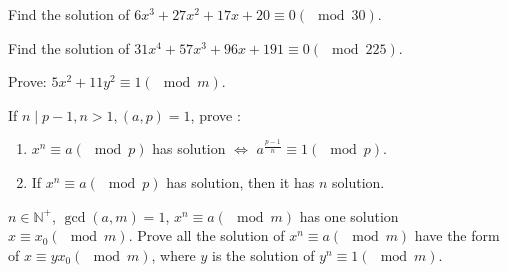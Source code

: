 \documentclass{ctexart}
\newif\ifpreface
\begin{document}
\large
\setlength{\baselineskip}{1.2em}
\ifpreface

\else
{}
\begin{problem}\label{pro:1}
  Find the solution of \(6x^3 + 27 x^2 + 17x + 20 \equiv 0 (\mod 30)\).

\end{problem}
\begin{solution}

\end{solution}

\begin{problem}\label{pro:2}
  Find the solution of \(31x^4 + 57x^3 + 96x + 191 \equiv 0 (\mod 225)\).
\end{problem}
\begin{solution}

\end{solution}
\begin{problem}\label{pro:3}
  Prove: \(5x^2 + 11y^2 \equiv 1 (\mod m)\).
\end{problem}
\begin{problem}\label{pro:4}
  If \(n \mid p-1, n > 1,(a,p)=1\), prove :
  \begin{enumerate}
    \item \(x^n \equiv a (\mod p)\) has solution \(\iff\) \(a^{\frac{p-1}{n}} \equiv 1 (\mod p)\).
    \item If \(x^n \equiv a (\mod p)\) has solution, then it has \(n\) solution.
  \end{enumerate}
\end{problem}
\begin{problem}\label{pro:5}
  \(n \in \mathbb{N}^+\), \(\gcd(a,m)=1\), \(x^n \equiv a (\mod m)\) has one solution \(x \equiv x_0 (\mod m)\).
  Prove all the solution of \(x^n \equiv a (\mod m)\) have the form of \(x \equiv yx_0 (\mod m)\),
  where \(y\) is the solution of \(y^n \equiv 1(\mod m)\).
\end{problem}
\end{document}
